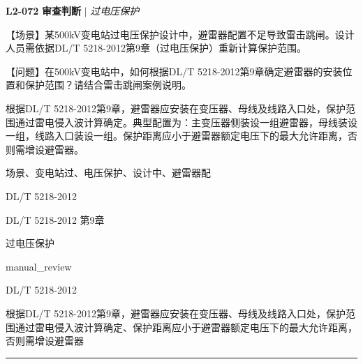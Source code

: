 \documentclass[11pt,a4paper]{ctexart}
\begin{document}
\noindent\textbf{L2-072} \hfill \textbf{审查判断} $|$ \textit{过电压保护}
\begin{description}[leftmargin=1.5em,style=nextline,font=\normalfont]
  \item[Q:] 【场景】某500kV变电站过电压保护设计中，避雷器配置不足导致雷击跳闸。设计人员需依据DL/T 5218-2012第9章（过电压保护）重新计算保护范围。

【问题】在500kV变电站中，如何根据DL/T 5218-2012第9章确定避雷器的安装位置和保护范围？请结合雷击跳闸案例说明。
  \item[A:] 根据DL/T 5218-2012第9章，避雷器应安装在变压器、母线及线路入口处，保护范围通过雷电侵入波计算确定。典型配置为：主变压器侧装设一组避雷器，母线装设一组，线路入口装设一组。保护距离应小于避雷器额定电压下的最大允许距离，否则需增设避雷器。
  \item[KW:] 场景、变电站过、电压保护、设计中、避雷器配
  \item[标准:] DL/T 5218-2012
  \item[条款溯源:] DL/T 5218-2012 第9章
  \item[主题:] 过电压保护
  \item[评分方式:] manual\_review
  \item[Rubric条款:] DL/T 5218-2012
  \item[Rubric判据:] 根据DL/T 5218-2012第9章，避雷器应安装在变压器、母线及线路入口处，保护范围通过雷电侵入波计算确定、保护距离应小于避雷器额定电压下的最大允许距离，否则需增设避雷器

\end{description}
\vspace{4pt}
\hrule
\vspace{6pt}
\end{document}
